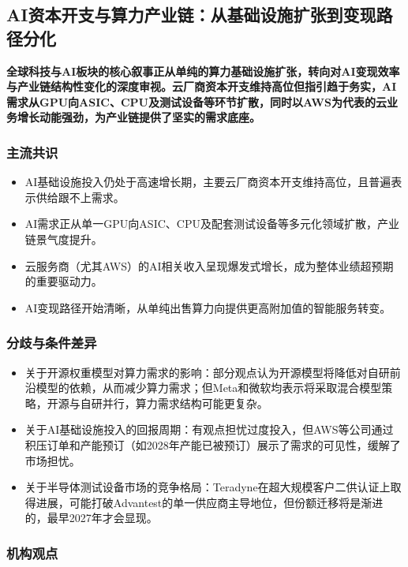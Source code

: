 \documentclass[11pt]{ctexart}
\begin{document}
\subsection{AI资本开支与算力产业链：从基础设施扩张到变现路径分化}
\textbf{全球科技与AI板块的核心叙事正从单纯的算力基础设施扩张，转向对AI变现效率与产业链结构性变化的深度审视。云厂商资本开支维持高位但指引趋于务实，AI需求从GPU向ASIC、CPU及测试设备等环节扩散，同时以AWS为代表的云业务增长动能强劲，为产业链提供了坚实的需求底座。}
\subsubsection*{主流共识}
\begin{itemize}
  \item AI基础设施投入仍处于高速增长期，主要云厂商资本开支维持高位，且普遍表示供给跟不上需求。
  \item AI需求正从单一GPU向ASIC、CPU及配套测试设备等多元化领域扩散，产业链景气度提升。
  \item 云服务商（尤其AWS）的AI相关收入呈现爆发式增长，成为整体业绩超预期的重要驱动力。
  \item AI变现路径开始清晰，从单纯出售算力向提供更高附加值的智能服务转变。
\end{itemize}
\subsubsection*{分歧与条件差异}
\begin{itemize}
  \item 关于开源权重模型对算力需求的影响：部分观点认为开源模型将降低对自研前沿模型的依赖，从而减少算力需求；但Meta和微软均表示将采取混合模型策略，开源与自研并行，算力需求结构可能更复杂。
  \item 关于AI基础设施投入的回报周期：有观点担忧过度投入，但AWS等公司通过积压订单和产能预订（如2028年产能已被预订）展示了需求的可见性，缓解了市场担忧。
  \item 关于半导体测试设备市场的竞争格局：Teradyne在超大规模客户二供认证上取得进展，可能打破Advantest的单一供应商主导地位，但份额迁移将是渐进的，最早2027年才会显现。
\end{itemize}
\subsubsection*{机构观点}
\end{document}

